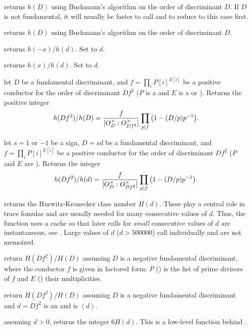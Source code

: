  returns $h(D)$ using Buchmann's algorithm
on the order of discriminant $D$. If $D$ is not fundamental, it will
usually be faster to call  and
 to reduce to this case first.

 returns $h(D)$ using Buchmann's algorithm
on the order of discriminant $D$.

 returns $h(-x)/h(d)$.
Set  to $d$.

 returns $h(x)/h(d)$.
Set  to $d$.

let $D$ be a fundamental discriminant, and $f = \prod_i P[i]^{E[i]}$ be a
positive conductor for the order of discriminant $Df^2$ ($P$ is a 
and $E$ is a  or ). Returns the positive integer
$$ h(Df^2) / h(D) = {f \over [O_D^\times : O_{Df^2}^\times]}
   \prod_{p | f} \big(1 - (D/p)p^{-1}\big).$$

let $s = 1$ or $-1$ be a sign, $D = sd$ be a fundamental discriminant,
and $f = \prod_i P[i]^{E[i]}$ be a positive conductor for the order of
discriminant $Df^2$ ($P$ and $E$ are ). Returns the integer
$$ h(Df^2)/h(d) = {f \over [O_D^\times : O_{Df^2}^\times]}
  \prod_{p | f} \big(1 - (D/p)p^{-1}\big).$$

 returns the Hurwitz-Kronecker class number $H(d)$.
These play a central role in trace fomulas and are usually needed for many
consecutive values of $d$. Thus, the function uses a cache so that later
calls for \emph{small} consecutive values of $d$ are instantaneous, see
. Large values of $d$ ($d > 500000$) call 
individually and are not memoized.

 return $H(Df^2)/H(D)$ assuming
$D$ is a negative fundamental discriminant, where the conductor $f$ is given in
factored form: $P$ () is the list of prime divisors of $f$ and $E$
() their multiplicities.

 return $H(Df^2)/H(D)$ assuming
$D$ is a negative fundamental discriminant and $d = Df^2$ is an 
and  is $(d)$.

 assuming $d > 0$, returns the integer $6 H(d)$.
This is a low-level function behind .


